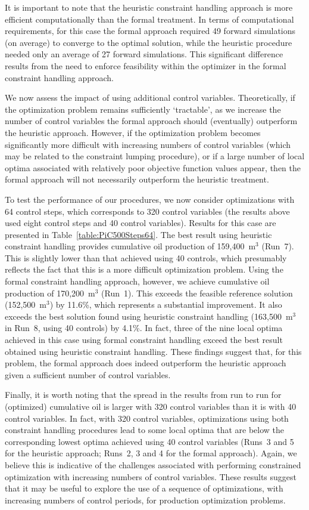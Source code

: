 It is important to note that the heuristic constraint handling approach is
more efficient computationally than the formal treatment. In terms of computational requirements, for this case the formal approach required 49 forward simulations (on average) to converge to the optimal solution, while the heuristic procedure needed only an average of 27 forward simulations. This significant difference results from the need to enforce feasibility within the optimizer in the formal constraint handling approach.


We now assess the impact of using additional control variables. Theoretically, if the optimization problem remains sufficiently `tractable', as we increase the number of control variables the formal approach should (eventually) outperform the heuristic approach. However, if the optimization problem becomes significantly more difficult with increasing numbers of control variables (which may be related to the constraint lumping procedure), or if a large number of local optima associated with relatively poor objective function values appear, then the formal approach will not necessarily outperform the heuristic treatment. 

To test the performance of our procedures, we now consider optimizations with 64 control steps, which corresponds to 320 control variables (the results above used eight control steps and 40 control variables). Results for this case are presented in Table~\ref{table:PiC500Steps64}. The best result using heuristic constraint handling provides cumulative oil production of 159,400~m$^3$ (Run~7). This is slightly lower than that achieved using 40 controls, which presumably reflects the fact that this is a more difficult optimization problem. Using the formal constraint handling approach, however, we achieve cumulative oil production of 170,200~m$^3$ (Run~1). This exceeds the feasible reference solution (152,500~m$^3$) by 11.6\%, which represents a substantial improvement. It also exceeds the best solution found using heuristic constraint handling (163,500~m$^3$ in Run~8, using 40 controls) by 4.1\%. In fact, three of the nine local optima achieved in this case using formal constraint handling exceed the best result obtained using heuristic constraint handling. These findings suggest that, for this problem, the formal approach does indeed outperform the heuristic approach given a sufficient number of control variables. 


Finally, it is worth noting that the spread in the results from run to run for (optimized) cumulative oil is larger with 320 control variables than it is with 40 control variables. In fact, with 320 control variables, optimizations using both constraint handling procedures lead to some local optima that are below the corresponding lowest optima achieved using 40 control variables (Runs~3 and 5 for the heuristic approach; Runs~2, 3 and 4 for the formal approach). Again, we believe this is indicative of the challenges associated with performing constrained optimization with increasing numbers of control variables. These results suggest that it may be useful to explore the use of a sequence of optimizations, with increasing numbers of control periods, for production optimization problems.


